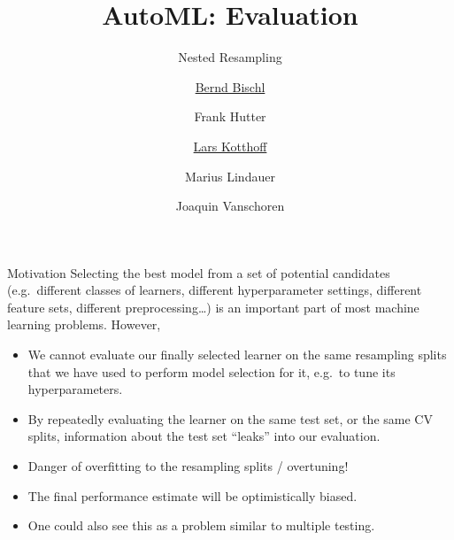 




\title[AutoML: Risks]{AutoML: Evaluation} %
\subtitle{Nested Resampling} %
\author[Lars Kotthoff]{\underline{Bernd Bischl} \and Frank Hutter \and \underline{Lars Kotthoff}\newline \and Marius Lindauer \and Joaquin Vanschoren}
\institute{}
\date{}

\newcommand\reffootnote[1]{%
    \begingroup
    \renewcommand\thefootnote{}\footnote{
        \tiny #1
    \vspace*{1em}}%
    \addtocounter{footnote}{-1}%
    \endgroup
}



	
	\maketitle

    \begin{frame}[c]{Motivation}
    Selecting the best model from a set of potential candidates (e.g.\ different
    classes of learners, different hyperparameter settings, different feature
    sets, different preprocessing\ldots) is an important part of most  machine
    learning problems. However,

    \begin{itemize}
        \item We cannot evaluate our finally selected learner on the same
            resampling splits that we have used to perform model selection for
            it, e.g.\ to tune its hyperparameters.
        \item By repeatedly evaluating the learner on the same test set, or the same CV splits, information
          about the test set \enquote{leaks} into our evaluation.
        \item Danger of overfitting to the resampling splits / overtuning!
        \item The final performance estimate will be optimistically biased.
        \item One could also see this as a problem similar to multiple testing.
    \end{itemize}
    \end{frame}

